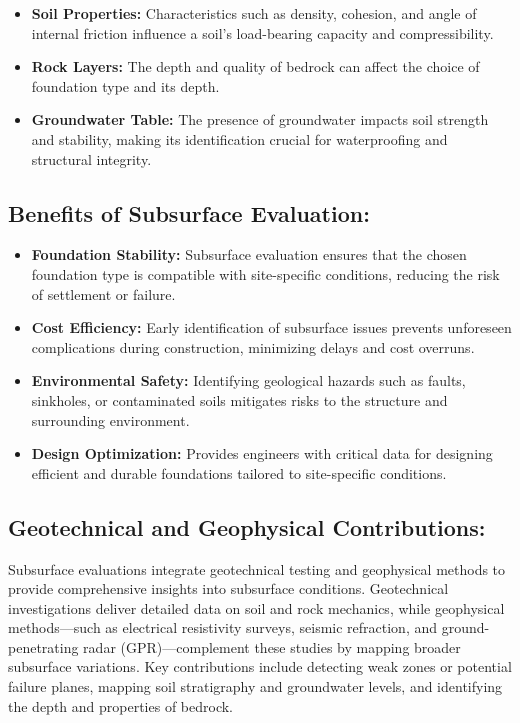 \documentclass[12pt,a4paper]{report}
\begin{document}
\begin{itemize}
    \item \textbf{Soil Properties:} Characteristics such as density, cohesion, and angle of internal friction influence a soil's load-bearing capacity and compressibility.
    \item \textbf{Rock Layers:} The depth and quality of bedrock can affect the choice of foundation type and its depth.
    \item \textbf{Groundwater Table:} The presence of groundwater impacts soil strength and stability, making its identification crucial for waterproofing and structural integrity.
\end{itemize}

\subsection{Benefits of Subsurface Evaluation:}
\begin{itemize}
    \item \textbf{Foundation Stability:} Subsurface evaluation ensures that the chosen foundation type is compatible with site-specific conditions, reducing the risk of settlement or failure.
    \item \textbf{Cost Efficiency:} Early identification of subsurface issues prevents unforeseen complications during construction, minimizing delays and cost overruns.
    \item \textbf{Environmental Safety:} Identifying geological hazards such as faults, sinkholes, or contaminated soils mitigates risks to the structure and surrounding environment.
    \item \textbf{Design Optimization:} Provides engineers with critical data for designing efficient and durable foundations tailored to site-specific conditions.
\end{itemize}

\subsection{Geotechnical and Geophysical Contributions:}
Subsurface evaluations integrate geotechnical testing and geophysical methods to provide comprehensive insights into subsurface conditions. Geotechnical investigations deliver detailed data on soil and rock mechanics, while geophysical methods—such as electrical resistivity surveys, seismic refraction, and ground-penetrating radar (GPR)—complement these studies by mapping broader subsurface variations. Key contributions include detecting weak zones or potential failure planes, mapping soil stratigraphy and groundwater levels, and identifying the depth and properties of bedrock.
\end{document}
